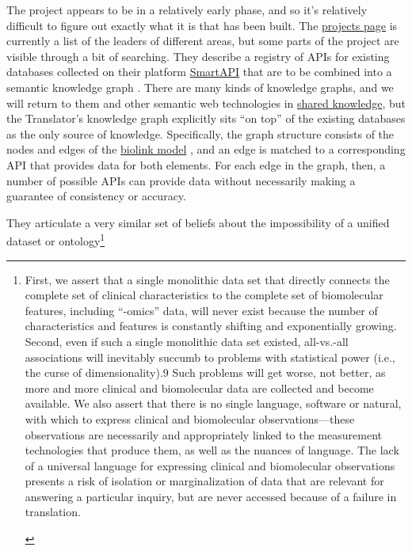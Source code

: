 \documentclass[10pt]{article}
\begin{document}
\begin{multicols}{2}
The project appears to be in a relatively early phase, and so it's
relatively difficult to figure out exactly what it is that has been
built. The
\href{https://web.archive.org/web/20210710012427/https://ncats.nih.gov/translator/projects}{projects
page} is currently a list of the leaders of different areas, but some
parts of the project are visible through a bit of searching. They
describe a registry of APIs for existing databases collected on their
platform \href{https://smart-api.info/portal/translator}{SmartAPI} that
are to be combined into a semantic knowledge graph \cite{consortiumUniversalBiomedicalData2019} . There are many kinds of
knowledge graphs, and we will return to them and other semantic web
technologies in \protect\hyperlink{shared-knowledge}{shared knowledge},
but the Translator's knowledge graph explicitly sits ``on top'' of the
existing databases as the only source of knowledge. Specifically, the
graph structure consists of the nodes and edges of the
\href{https://github.com/biolink/biolink-model}{biolink model} \cite{bruskiewichBiolinkBiolinkmodel2021} , and an edge is matched to a
corresponding API that provides data for both elements. For each edge in
the graph, then, a number of possible APIs can provide data without
necessarily making a guarantee of consistency or accuracy.

They articulate a very similar set of beliefs about the impossibility of
a unified dataset or ontology\footnote{\begin{leftbar}
  First, we assert that a single monolithic data set that directly
  connects the complete set of clinical characteristics to the complete
  set of biomolecular features, including ``-omics'' data, will never
  exist because the number of characteristics and features is constantly
  shifting and exponentially growing. Second, even if such a single
  monolithic data set existed, all-vs.-all associations will inevitably
  succumb to problems with statistical power (i.e., the curse of
  dimensionality).9 Such problems will get worse, not better, as more
  and more clinical and biomolecular data are collected and become
  available. We also assert that there is no single language, software
  or natural, with which to express clinical and biomolecular
  observations---these observations are necessarily and appropriately
  linked to the measurement technologies that produce them, as well as
  the nuances of language. The lack of a universal language for
  expressing clinical and biomolecular observations presents a risk of
  isolation or marginalization of data that are relevant for answering a
  particular inquiry, but are never accessed because of a failure in
  translation.


\end{leftbar}}
\end{multicols}
\end{document}
